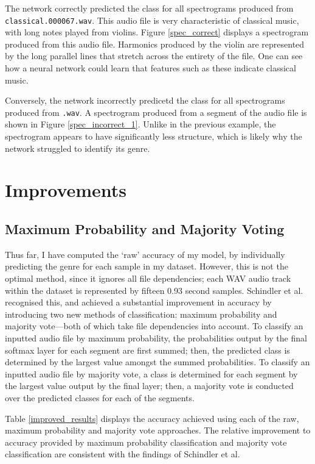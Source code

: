 \documentclass[conference]{IEEEtran}
\begin{document}
The network correctly predicted the class for all spectrograms produced from \texttt{classical.000067.wav}.
This audio file is very characteristic of classical music, with long notes played from violins.
Figure \ref{spec_correct} displays a spectrogram produced from this audio file.
Harmonics produced by the violin are represented by the long parallel lines that stretch across the entirety of the file.
One can see how a neural network could learn that features such as these indicate classical music.

Conversely, the network incorrectly predicetd the class for all spectrograms produced from \texttt{.wav}.
A spectrogram produced from a segment of the audio file is shown in Figure \ref{spec_incorrect_1}.
Unlike in the previous example, the spectrogram appears to have significantly less structure, which is likely why the network struggled to identify its genre.

\section{Improvements}

\subsection{Maximum Probability and Majority Voting}

Thus far, I have computed the `raw' accuracy of my model, by individually predicting the genre for each sample in my dataset.
However, this is not the optimal method, since it ignores all file dependencies; each WAV audio track within the dataset is represented by fifteen 0.93 second samples.
Schindler et al. recognised this, and achieved a substantial improvement in accuracy by introducing two new methods of classification: maximum probability and majority vote---both of which take file dependencies into account.
To classify an inputted audio file by maximum probability, the probabilities output by the final softmax layer for each segment are first summed; then, the predicted class is determined by the largest value amongst the summed probabilities.
To classify an inputted audio file by majority vote, a class is determined for each segment by the largest value output by the final layer; then, a majority vote is conducted over the predicted classes for each of the segments.

Table \ref{improved_results} displays the accuracy achieved using each of the raw, maximum probability and majority vote approaches.
The relative improvement to accuracy provided by maximum probability classification and majority vote classification are consistent with the findings of Schindler et al.
\end{document}
